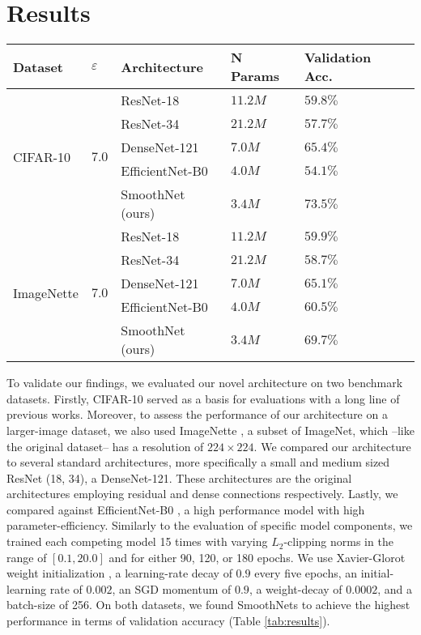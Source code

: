 \documentclass[nohyperref]{article}
\theoremstyle{plain}
\theoremstyle{definition}
\theoremstyle{remark}
\begin{document}
\section{Results} 
\begin{table*}[ht]
    \centering
    \begin{tabular}{@{}llllll@{}}
    \toprule
        Dataset & $\varepsilon$  & Architecture& N Params& Validation Acc.  \\ \midrule \multirow{5}{*}{CIFAR-10} & \multirow{5}{*}{$7.0$} & ResNet-18 & $11.2M$ & $59.8\%$\\
        && ResNet-34 & $21.2M$ & $57.7\%$ \\
&& DenseNet-121 & $7.0M$ & $65.4\%$\\
        && EfficientNet-B0 & $4.0M$ & $54.1\%$\\
        && SmoothNet (ours) &$3.4M$ & $\mathbf{73.5\%}$\\ \midrule
\multirow{5}{*}{ImageNette} & \multirow{5}{*}{$7.0$} & ResNet-18 & $11.2M$ & $59.9\%$\\
        && ResNet-34 & $21.2M$ & $58.7\%$\\
&& DenseNet-121 & $7.0M$ & $65.1\%$ \\&& EfficientNet-B0 & $4.0M$ & $60.5\%$\\
        && SmoothNet (ours) &  $3.4M$ & $\mathbf{69.7}\%$ \\\bottomrule
    \end{tabular}
    \caption{Benchmarking SmoothNet against standard architectures on CIFAR-10 and ImageNette with Differential Privacy. N Params refers to the number of trainable parameters in the network in Millions. Validation Acc. refers to the corresponding row's best model's accuracy on the validation set.}
    \label{tab:results}
\end{table*}
To validate our findings, we evaluated our novel architecture on two benchmark datasets. Firstly, CIFAR-10 served as a basis for evaluations with a long line of previous works. Moreover, to assess the performance of our architecture on a larger-image dataset, we also used ImageNette \cite{imagenette}, a subset of ImageNet, which --like the original dataset-- has a resolution of $224 \times 224$. We compared our architecture to several standard architectures, more specifically a small and medium sized ResNet (18, 34), a DenseNet-121. These architectures are the original architectures employing residual and dense connections respectively.  Lastly, we compared against EfficientNet-B0 \cite{tan2019efficientnet}, a high performance model with high parameter-efficiency. Similarly to the evaluation of specific model components, we trained each competing model 15 times with varying $L_2$-clipping norms in the range of $[0.1, 20.0]$ and for either 90, 120, or 180 epochs. We use Xavier-Glorot weight initialization \cite{Glorot2010UnderstandingTD}, a learning-rate decay of $0.9$ every five epochs, an initial-learning rate of $0.002$, an SGD momentum of $0.9$, a weight-decay of $0.0002$, and a batch-size of 256.
On both datasets, we found SmoothNets to achieve the highest performance in terms of validation accuracy (Table \ref{tab:results}). 
\end{document}

